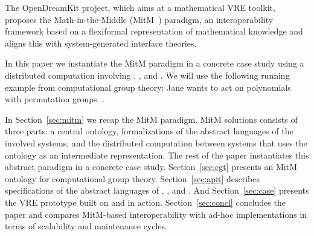 The OpenDreamKit project, which aims at a mathematical VRE toolkit, proposes the Math-in-the-Middle (MitM~\cite{DehKohKon:iop16}) paradigm, an interoperability framework based on a flexiformal representation of mathematical knowledge and aligns this with system-generated interface theories. 

In this paper we instantiate the MitM paradigm in a concrete case study using a distributed computation involving \GAP, \Sage, and \Singular.
We will use the following running example from computational group theory: Jane wants to act on \Singular polynomials with \GAP permutation groups.
.

In Section~\ref{sec:mitm} we recap the MitM paradigm.
MitM solutions consists of three parts: a central ontology, formalizations of the abstract languages of the involved systems, and the distributed computation between systems that uses the ontology as an intermediate representation.
The rest of the paper instantiates this abstract paradigm in a concrete case study.
Section~\ref{sec:cgt} presents an MitM ontology for computational group theory.
Section~\ref{sec:apit} describes specifications of the abstract languages of \GAP, \Sage, and \Singular.
And Section~\ref{sec:case} presents the VRE prototype built on \GAP and \Singular in action.
Section~\ref{sec:concl} concludes the paper and compares MitM-based interoperability with ad-hoc implementations in terms of scalability and maintenance cycles. 



